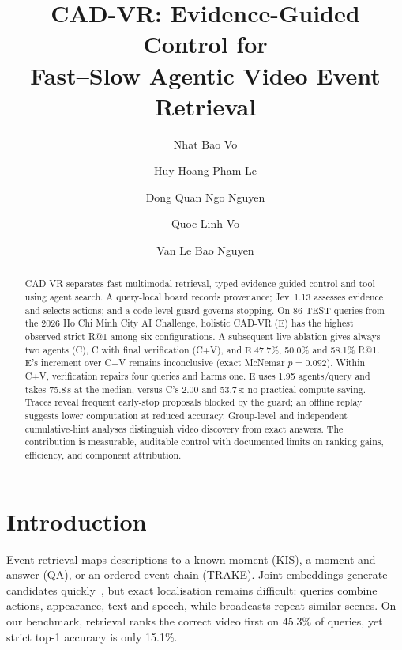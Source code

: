 \documentclass[runningheads]{llncs}
\begin{document}
\pagestyle{empty}
\title{CAD-VR: Evidence-Guided Control for\\Fast--Slow Agentic Video Event Retrieval}
\author{Nhat Bao Vo \and Huy Hoang Pham Le \and Dong Quan Ngo Nguyen \and Quoc Linh Vo \and Van Le Bao Nguyen}
\maketitle
\thispagestyle{empty}

\begin{abstract}
CAD-VR separates fast multimodal retrieval, typed evidence-guided control and tool-using agent search. A query-local board records provenance; Jev~1.13 assesses evidence and selects actions; and a code-level guard governs stopping. On 86 TEST queries from the 2026 Ho Chi Minh City AI Challenge, holistic CAD-VR (E) has the highest observed strict R@1 among six configurations. A subsequent live ablation gives always-two agents (C), C with final verification (C+V), and E 47.7\%, 50.0\% and 58.1\% R@1. E's increment over C+V remains inconclusive (exact McNemar $p=0.092$). Within C+V, verification repairs four queries and harms one. E uses 1.95 agents/query and takes 75.8\,s at the median, versus C's 2.00 and 53.7\,s: no practical compute saving. Traces reveal frequent early-stop proposals blocked by the guard; an offline replay suggests lower computation at reduced accuracy. Group-level and independent cumulative-hint analyses distinguish video discovery from exact answers. The contribution is measurable, auditable control with documented limits on ranking gains, efficiency, and component attribution.
\end{abstract}

\section{Introduction}
\label{sec:intro}
Event retrieval maps descriptions to a known moment (KIS), a moment and answer (QA), or an ordered event chain (TRAKE). Joint embeddings generate candidates quickly~\cite{lokoc2023lessons,pe2025}, but exact localisation remains difficult: queries combine actions, appearance, text and speech, while broadcasts repeat similar scenes. On our benchmark, retrieval ranks the correct video first on 45.3\% of queries, yet strict top-1 accuracy is only 15.1\%.
\end{document}
